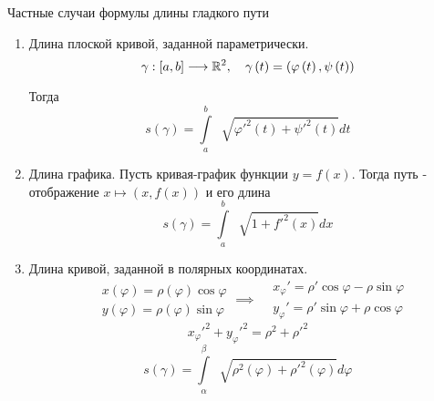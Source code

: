 \documentclass[../main.tex]{subfiles}
\begin{document}
\begin{prop}{Частные случаи формулы длины гладкого пути}
    \begin{enumerate}
        \item Длина плоской кривой, заданной параметрически. 
        \[ \gamma : \left[ a,b\right] \longrightarrow \mathbb{R} ^2,\quad \gamma\left( t\right)=\left( \varphi \left( t\right), \psi\left( t\right)\right)\]
        \par Тогда
        \[ \boxed{s\left( \gamma \right)= \displaystyle\int\limits_{ a}^{ b} \;\sqrt[]{ \varphi '^2\left( t\right)+\psi'^2\left( t\right)}dt}\] 
        \item Длина графика. Пусть кривая-график функции \( y = f\left( x\right)\). Тогда путь - отображение \( x \longmapsto \left( x, f\left( x\right)\right)\) и его длина 
        \[ \boxed{s\left( \gamma \right)= \displaystyle\int\limits_{ a}^{ b} \;\sqrt[]{1+f'^2\left( x\right)}dx}\]
        \item Длина кривой, заданной в полярных координатах. 
        \begin{equation*}
            \begin{aligned}
                &x\left( \varphi \right)= \rho\left( \varphi \right) \cos \varphi \\ 
                &y\left( \varphi \right)= \rho\left( \varphi \right) \sin \varphi 
            \end{aligned}
            \implies 
            \begin{aligned}
                &x_ \varphi '= \rho' \cos \varphi - \rho \sin \varphi \\ 
                &y_ \varphi '= \rho' \sin \varphi + \rho \cos \varphi 
            \end{aligned}
        \end{equation*}
        \[ x_ \varphi '^2+ y_ \varphi '^2= \rho^2+ \rho'^2\]
        \[ \boxed{s\left( \gamma \right)= \displaystyle\int\limits_{ \alpha }^{ \beta } \;\sqrt[]{ \rho^2\left( \varphi \right)+ \rho'^2\left( \varphi \right)}d \varphi }\]
    \end{enumerate}
\end{prop}
\end{document}
